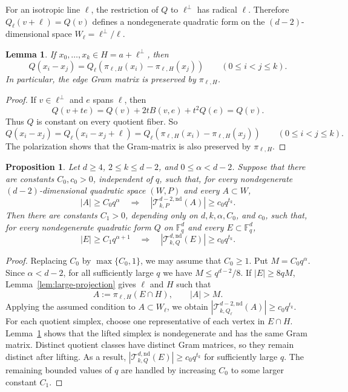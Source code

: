 \documentclass[11pt]{article}
\newtheorem{proposition}[theorem]{Proposition}
\newtheorem{lemma}[theorem]{Lemma}
\theoremstyle{remark}
\numberwithin{equation}{section}
\newcommand{\Fq}{\mathbb F_q}
\newcommand{\cT}{\mathcal T}
\newcommand{\1}{\mathbf 1}
\begin{document}
For an isotropic line $\ell$, the restriction of \(Q\) to \(\ell^\perp\) has radical \(\ell\). Therefore $Q_\ell(v+\ell)=Q(v)$ defines a nondegenerate quadratic form on the \((d-2)\)-dimensional space $W_\ell=\ell^\perp/\ell$. 

\begin{lemma}\label{lem:preserve-gram}
If \(x_0,\ldots,x_k\in H=a+\ell^\perp\), then
\[
 Q(x_i-x_j)
 =
 Q_\ell\!\left(
   \pi_{\ell,H}(x_i)-\pi_{\ell,H}(x_j)
 \right)
 \qquad(0\le i<j\le k).
\]
In particular, the edge Gram matrix is preserved by
\(\pi_{\ell,H}\).
\end{lemma}

\begin{proof}
If \(v\in\ell^\perp\) and \(e\) spans \(\ell\), then
\[
        Q(v+te)=Q(v)+2tB(v,e)+t^2Q(e)=Q(v).
\]
Thus \(Q\) is constant on every quotient fiber. So
\[
 Q(x_i-x_j)
 =
 Q_\ell(x_i-x_j+\ell)
 =
 Q_\ell\!\left(
   \pi_{\ell,H}(x_i)-\pi_{\ell,H}(x_j)
 \right)
 \qquad(0\le i<j\le k).
\]
The polarization shows that the Gram-matrix is also preserved by $\pi_{\ell,H}$.
\end{proof}

\begin{proposition}\label{prop:one-step}
Let \(d\ge4\), \(2\le k\le d-2\), and \(0\le\alpha<d-2\). Suppose that there are constants \(C_0,c_0>0\), independent of \(q\),
such that, for every nondegenerate $(d-2)$-dimensional quadratic space $(W,P)$ and every \(A\subset W\),
\[
 |A|\ge C_0q^\alpha
 \quad\Longrightarrow\quad
 |\cT^{d-2,\mathrm{nd}}_{k,P}(A)|
 \ge c_0q^{t_k}.
\]
Then there are constants \(C_1>0\), depending only on \(d,k,\alpha,C_0\), and \(c_0\), such that, for every nondegenerate
quadratic form \(Q\) on \(\Fq^d\) and every \(E\subset\Fq^d\),
\[
 |E|\ge C_1q^{\alpha+1}
 \quad\Longrightarrow\quad
 |\cT^{d,\mathrm{nd}}_{k,Q}(E)|
 \ge c_0q^{t_k}.
\]
\end{proposition}

\begin{proof}
Replacing \(C_0\) by \(\max\{C_0,1\}\), we may assume that \(C_0\ge1\). Put \(M=C_0q^\alpha\). Since \(\alpha<d-2\), for all
sufficiently large \(q\) we have \(M\le q^{d-2}/8\). If \(|E|\ge8qM\), Lemma~\ref{lem:large-projection} gives
\(\ell\) and \(H\) such that
\[
        A:=\pi_{\ell,H}(E\cap H),
        \qquad
        |A|>M.
\]
Applying the assumed condition to \(A\subset W_\ell\), we obtain $|\cT^{d-2,\mathrm{nd}}_{k,Q_\ell}(A)|  \ge c_0q^{t_k}$. For each quotient simplex, choose one representative of each vertex in \(E\cap H\). Lemma~\ref{lem:preserve-gram} shows that the lifted simplex is nondegenerate and has the same Gram matrix. Distinct quotient
classes have distinct Gram matrices, so they remain distinct after lifting. As a result, $|\cT^{d,\mathrm{nd}}_{k,Q}(E)| \ge c_0 q^{t_k}$ for sufficiently large $q$. The remaining bounded values of \(q\) are handled by increasing $C_0$ to some larger constant $C_1$.
\end{proof}
\end{document}
